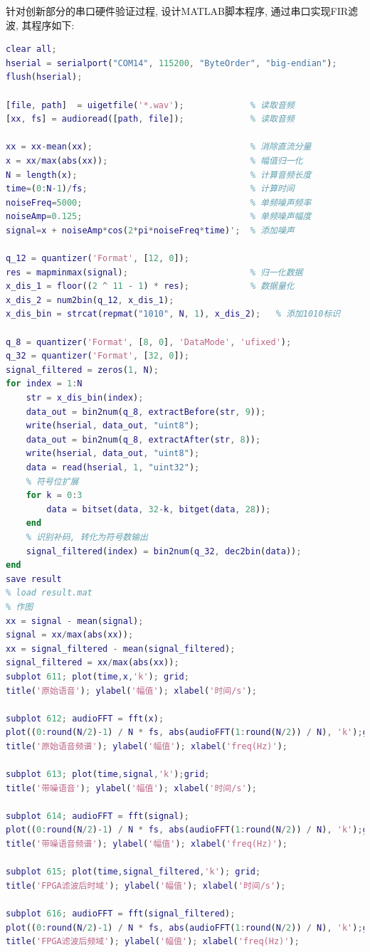 \documentclass{article}
\begin{document}
针对创新部分的串口硬件验证过程, 设计MATLAB脚本程序, 通过串口实现FIR滤波, 其程序如下:
\begin{lstlisting}[language=Matlab, caption={Matlab通过串口与FPGA的FIR传输数据并验证}]
clear all;
hserial = serialport("COM14", 115200, "ByteOrder", "big-endian");
flush(hserial);

[file, path]  = uigetfile('*.wav');             % 读取音频
[xx, fs] = audioread([path, file]);             % 读取音频

xx = xx-mean(xx);                               % 消除直流分量
x = xx/max(abs(xx));                            % 幅值归一化
N = length(x);                                  % 计算音频长度
time=(0:N-1)/fs;                                % 计算时间
noiseFreq=5000;                                 % 单频噪声频率
noiseAmp=0.125;                                 % 单频噪声幅度
signal=x + noiseAmp*cos(2*pi*noiseFreq*time)';  % 添加噪声

q_12 = quantizer('Format', [12, 0]);
res = mapminmax(signal);                        % 归一化数据
x_dis_1 = floor((2 ^ 11 - 1) * res);            % 数据量化
x_dis_2 = num2bin(q_12, x_dis_1);
x_dis_bin = strcat(repmat("1010", N, 1), x_dis_2);   % 添加1010标识

q_8 = quantizer('Format', [8, 0], 'DataMode', 'ufixed');
q_32 = quantizer('Format', [32, 0]);
signal_filtered = zeros(1, N);
for index = 1:N
    str = x_dis_bin(index);
    data_out = bin2num(q_8, extractBefore(str, 9));
    write(hserial, data_out, "uint8");
    data_out = bin2num(q_8, extractAfter(str, 8));
    write(hserial, data_out, "uint8");
    data = read(hserial, 1, "uint32");
    % 符号位扩展
    for k = 0:3
        data = bitset(data, 32-k, bitget(data, 28));
    end
    % 识别补码, 转化为符号数输出
    signal_filtered(index) = bin2num(q_32, dec2bin(data));
end
save result
% load result.mat
% 作图
xx = signal - mean(signal);
signal = xx/max(abs(xx));
xx = signal_filtered - mean(signal_filtered);
signal_filtered = xx/max(abs(xx));
subplot 611; plot(time,x,'k'); grid;
title('原始语音'); ylabel('幅值'); xlabel('时间/s');

subplot 612; audioFFT = fft(x);
plot((0:round(N/2)-1) / N * fs, abs(audioFFT(1:round(N/2)) / N), 'k');grid;
title('原始语音频谱'); ylabel('幅值'); xlabel('freq(Hz)');

subplot 613; plot(time,signal,'k');grid;
title('带噪语音'); ylabel('幅值'); xlabel('时间/s');

subplot 614; audioFFT = fft(signal);
plot((0:round(N/2)-1) / N * fs, abs(audioFFT(1:round(N/2)) / N), 'k');grid;
title('带噪语音频谱'); ylabel('幅值'); xlabel('freq(Hz)');

subplot 615; plot(time,signal_filtered,'k'); grid;
title('FPGA滤波后时域'); ylabel('幅值'); xlabel('时间/s');

subplot 616; audioFFT = fft(signal_filtered);
plot((0:round(N/2)-1) / N * fs, abs(audioFFT(1:round(N/2)) / N), 'k');grid;
title('FPGA滤波后频域'); ylabel('幅值'); xlabel('freq(Hz)');
\end{lstlisting}
\end{document}

